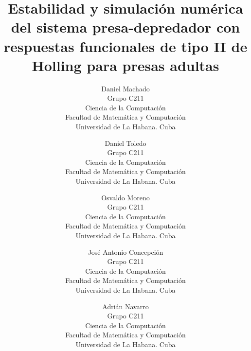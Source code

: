 \documentclass{wscpaperproc}
\theoremstyle{wsc}
\begin{document}
%
%

\title{Estabilidad y simulaci\'on num\'erica del sistema presa-depredador con respuestas funcionales de tipo II de Holling para presas adultas}

\author{
	Daniel Machado \\[12pt]
	Grupo C211\\
	Ciencia de la Computaci\'on\\
	Facultad de Matem\'atica y Computaci\'on\\
	Universidad de La Habana. Cuba\\
\and
	Daniel Toledo\\[12pt]
	Grupo C211\\
	Ciencia de la Computaci\'on\\
	Facultad de Matem\'atica y Computaci\'on\\
	Universidad de La Habana. Cuba\\
\and
	Osvaldo Moreno\\[12pt]
	Grupo C211\\
    Ciencia de la Computaci\'on\\
	Facultad de Matem\'atica y Computaci\'on\\
	Universidad de La Habana. Cuba\\
\and
	Jos\'e Antonio Concepci\'on\\[12pt]
	Grupo C211\\
	Ciencia de la Computaci\'on\\
	Facultad de Matem\'atica y Computaci\'on\\
	Universidad de La Habana. Cuba\\
\and
	Adri\'an Navarro\\[12pt]
	Grupo C211\\
	Ciencia de la Computaci\'on\\
	Facultad de Matem\'atica y Computaci\'on\\
	Universidad de La Habana. Cuba\\
}
\end{document}
